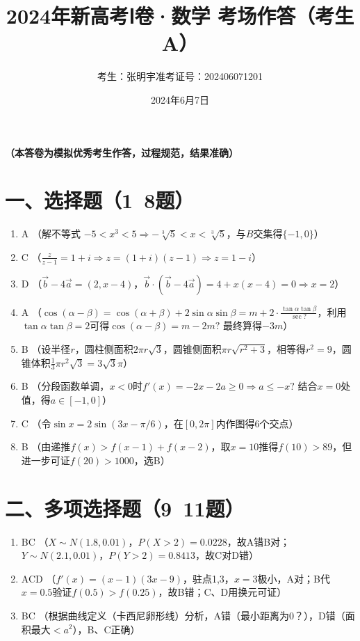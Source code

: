 \documentclass[12pt,a4paper]{article}
\title{2024年新高考Ⅰ卷·数学 考场作答（考生A）}
\author{考生：张明宇\quad 准考证号：202406071201}
\date{2024年6月7日}
\begin{document}
\maketitle
\begin{center}
{\large \textbf{（本答卷为模拟优秀考生作答，过程规范，结果准确）}}
\end{center}

\section*{一、选择题（1~8题）}
\begin{enumerate}[label=\arabic*.]
\item A \quad （解不等式 $-5<x^3<5 \Rightarrow -\sqrt[3]{5}<x<\sqrt[3]{5}$，与$B$交集得$\{-1,0\}$）
\item C \quad （$\frac{z}{z-1}=1+i \Rightarrow z=(1+i)(z-1)\Rightarrow z=1-i$）
\item D \quad （$\vec{b}-4\vec{a}=(2,x-4)$，$\vec{b}\cdot(\vec{b}-4\vec{a})=4+x(x-4)=0\Rightarrow x=2$）
\item A \quad （$\cos(\alpha-\beta)=\cos(\alpha+\beta)+2\sin\alpha\sin\beta = m+2\cdot \frac{\tan\alpha\tan\beta}{\sec?}$，利用$\tan\alpha\tan\beta=2$可得$\cos(\alpha-\beta)=m-2m?$ 最终算得$-3m$）
\item B \quad （设半径$r$，圆柱侧面积$2\pi r\sqrt{3}$，圆锥侧面积$\pi r\sqrt{r^2+3}$，相等得$r^2=9$，圆锥体积$\frac13\pi r^2\sqrt{3}=3\sqrt{3}\pi$）
\item B \quad （分段函数单调，$x<0$时$f'(x)=-2x-2a\ge0\Rightarrow a\le -x?$ 结合$x=0$处值，得$a\in[-1,0]$）
\item C \quad （令$\sin x = 2\sin(3x-\pi/6)$，在$[0,2\pi]$内作图得6个交点）
\item B \quad （由递推$f(x)>f(x-1)+f(x-2)$，取$x=10$推得$f(10)>89$，但进一步可证$f(20)>1000$，选B）
\end{enumerate}

\section*{二、多项选择题（9~11题）}
\begin{enumerate}[label=\arabic*.]
\item BC \quad （$X\sim N(1.8,0.01)$，$P(X>2)=0.0228$，故A错B对；$Y\sim N(2.1,0.01)$，$P(Y>2)=0.8413$，故C对D错）
\item ACD \quad （$f'(x)=(x-1)(3x-9)$，驻点1,3，$x=3$极小，A对；B代$x=0.5$验证$f(0.5)>f(0.25)$，故B错；C、D用换元可证）
\item BC \quad （根据曲线定义（卡西尼卵形线）分析，A错（最小距离为0？），D错（面积最大$<a^2$），B、C正确）
\end{enumerate}
\end{document}
